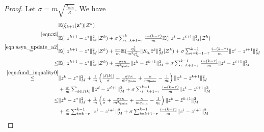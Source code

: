\begin{proof}Let $\sigma=m\sqrt{\frac{q_{\min}}{\kappa}}$. We have 
\begin{align*}
~&\mathbb{E} (\xi_{k+1}(\vz^*) | \cZ^k)  \\
\overset{\eqref{eqn:xi}}= & \textstyle \mathbb{E} (\|z^{k+1} - z^*\|_M^2| \cZ^k)
+ \sigma\sum_{i=k+1-\tau}^{k} \frac{i-(k-\tau)}{m} \mathbb{E} (\| z^{ i} -
z^{i+1}\|_M^2 | \cZ^k) \\
  \overset{\eqref{eqn:asyn_update_a2}}= & \textstyle\mathbb{E} (\|z^{k+1} -
  z^*\|_M^2| \cZ^k) + \frac{\sigma\tau}{m}
  \mathbb{E}(\frac{\eta_k^2}{m^2q_{i_k}^2}\| S_{i_k}\hat z^k\|_M^2|\cZ^k) + 
  \sigma\sum_{i=k+1-\tau}^{k-1} \frac{i-(k-\tau)}{m} \| z^{i} - z^{i+1}\|_M^2\\
          \le & \textstyle\mathbb{E} (\|z^{k+1} - z^*\|_M^2| \cZ^k) +
          \frac{\sigma\tau\kappa}{m^3q_{\min}} \| z^{k } -
          \bar{z}^{k+1}\|_M^2 + \sigma\sum_{i=k+1-\tau}^{k-1} \frac{i-(k-\tau)}{m} \| z^{i} -
          z^{i+1}\|_M^2\\
  \overset{\eqref{eqn:fund_inquality0}}\leq &\textstyle\|z^k - z^*\|_M^2 +
  \frac{1}{m} \left({|J(k)|\over \sigma} +
  \frac{\sigma\tau\kappa}{m^2q_{\min}} +
  {\kappa\over mq_{\min}} - \frac{1}{\eta_k}\right) \|z^k -
  \bar{z}^{k+1}\|_M^2   \\
&\textstyle+\frac{\sigma}{m}\sum_{d\in J(k)}\|{z}^{d} - {z}^{d+1}\|_M^2 + 
\sigma\sum_{i=k+1-\tau}^{k-1} \frac{i-(k-\tau)}{m} \| z^{i} - z^{i+1}\|_M^2\\
 \leq &\textstyle\|z^k - z^*\|_M^2 + \frac{1}{m} \left({\tau\over \sigma} +
 \frac{\sigma\tau\kappa}{m^2q_{\min}} +
 {\kappa\over mq_{\min}} - \frac{1}{ \eta_k}\right) \|z^k -
 \bar{z}^{k+1}\|_M^2   \\
&\textstyle+\frac{\sigma}{m}\sum_{i=k-\tau}^{k - 1}\|{z}^{i} - {z}^{i+1}\|_M^2 + 
\sigma\sum_{i=k+1-\tau}^{k-1} \frac{i-(k-\tau)}{m} \| z^{i} - z^{i+1}\|_M^2\\

\end{align*}
\end{proof}
